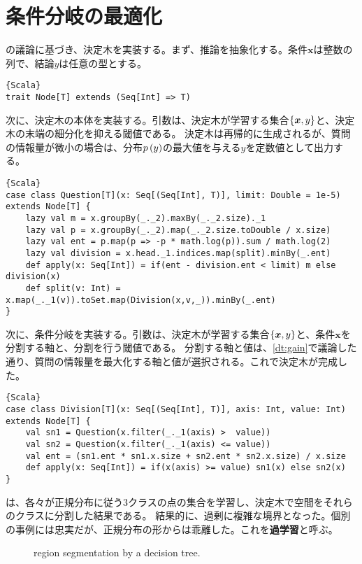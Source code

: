 \documentclass[10pt,a4paper]{book}
\begin{document}
\section{条件分岐の最適化}

の議論に基づき、決定木を実装する。まず、推論を抽象化する。条件$\bm{x}$は整数の列で、結論$y$は任意の型とする。

\begin{Verbatim}{Scala}
trait Node[T] extends (Seq[Int] => T)
\end{Verbatim}

次に、決定木の本体を実装する。引数は、決定木が学習する集合$\seqXy$と、決定木の末端の細分化を抑える閾値である。
決定木は再帰的に生成されるが、質問の情報量が微小の場合は、分布$\prob{y}$の最大値を与える$y$を定数値として出力する。

\begin{Verbatim}{Scala}
case class Question[T](x: Seq[(Seq[Int], T)], limit: Double = 1e-5) extends Node[T] {
	lazy val m = x.groupBy(_._2).maxBy(_._2.size)._1
	lazy val p = x.groupBy(_._2).map(_._2.size.toDouble / x.size)
	lazy val ent = p.map(p => -p * math.log(p)).sum / math.log(2)
	lazy val division = x.head._1.indices.map(split).minBy(_.ent)
	def apply(x: Seq[Int]) = if(ent - division.ent < limit) m else division(x)
	def split(v: Int) = x.map(_._1(v)).toSet.map(Division(x,v,_)).minBy(_.ent)
}
\end{Verbatim}

次に、条件分岐を実装する。引数は、決定木が学習する集合$\seqXy$と、条件$\bm{x}$を分割する軸と、分割を行う閾値である。
分割する軸と値は、\eqref{dt:gain}で議論した通り、質問の情報量を最大化する軸と値が選択される。これで決定木が完成した。

\begin{Verbatim}{Scala}
case class Division[T](x: Seq[(Seq[Int], T)], axis: Int, value: Int) extends Node[T] {
	val sn1 = Question(x.filter(_._1(axis) >  value))
	val sn2 = Question(x.filter(_._1(axis) <= value))
	val ent = (sn1.ent * sn1.x.size + sn2.ent * sn2.x.size) / x.size
	def apply(x: Seq[Int]) = if(x(axis) >= value) sn1(x) else sn2(x)
}
\end{Verbatim}

は、各々が正規分布に従う3クラスの点の集合を学習し、決定木で空間をそれらのクラスに分割した結果である。
結果的に、過剰に複雑な境界となった。個別の事例には忠実だが、正規分布の形からは乖離した。これを\textbf{過学習}と呼ぶ。

\begin{figure}[h]
\centering
{}
\caption{region segmentation by a decision tree.\label{fig:dt:plain}}
\end{figure}
\end{document}
